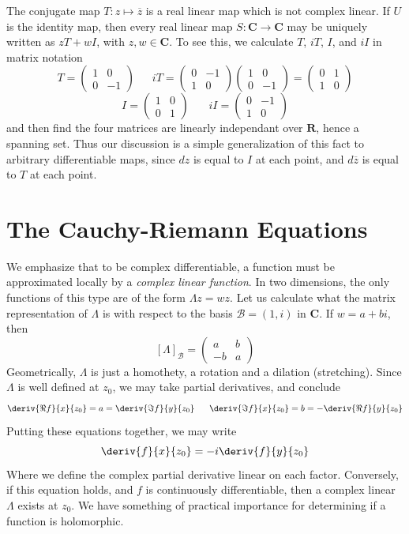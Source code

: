 The conjugate map $T: z \mapsto \overline{z}$ is a real linear map which is not complex linear. If $U$ is the identity map, then every real linear map $S: \mathbf{C} \to \mathbf{C}$ may be uniquely written as $zT + wI$, with $z,w \in \mathbf{C}$. To see this, we calculate $T$, $iT$, $I$, and $iI$ in matrix notation
%
\[ T = \begin{pmatrix} 1 & 0 \\ 0 & -1 \end{pmatrix} \ \ \ \ \ \ \ iT = \begin{pmatrix} 0 & -1 \\ 1 & 0 \end{pmatrix} \begin{pmatrix} 1 & 0 \\ 0 & -1 \end{pmatrix} = \begin{pmatrix} 0 & 1 \\ 1 & 0 \end{pmatrix} \]
%
\[ I = \begin{pmatrix} 1 & 0 \\ 0 & 1 \end{pmatrix}\ \ \ \ \ \ \ \ iI = \begin{pmatrix} 0 & -1 \\ 1 & 0 \end{pmatrix} \]
%
and then find the four matrices are linearly independant over $\mathbf{R}$, hence a spanning set. Thus our discussion is a simple generalization of this fact to arbitrary differentiable maps, since $dz$ is equal to $I$ at each point, and $d \overline{z}$ is equal to $T$ at each point.




\section{The Cauchy-Riemann Equations}

We emphasize that to be complex differentiable, a function must be approximated locally by a {\it complex linear function}. In two dimensions, the only functions of this type are of the form $\Lambda z = wz$. Let us calculate what the matrix representation of $\Lambda$ is with respect to the basis $\mathcal{B} = (1, i)$ in $\mathbf{C}$. If $w = a + bi$, then
%
\[ [\Lambda]_{\mathcal{B}} = \begin{pmatrix} a & b \\ -b & a \end{pmatrix} \]
%
Geometrically, $\Lambda$ is just a homothety, a rotation and a dilation (stretching). Since $\Lambda$ is well defined at $z_0$, we may take partial derivatives, and conclude
%
\[ \deriv{\Re f}{x}{z_0} = a = \deriv{\Im f}{y}{z_0}\ \ \ \ \ \deriv{\Im f}{x}{z_0} = b = -\deriv{\Re f}{y}{z_0} \]
%
Putting these equations together, we may write
%
\[ \deriv{f}{x}{z_0} = -i \deriv{f}{y}{z_0} \]
%
Where we define the complex partial derivative linear on each factor. Conversely, if this equation holds, and $f$ is continuously differentiable, then a complex linear $\Lambda$ exists at $z_0$. We have something of practical importance for determining if a function is holomorphic.

